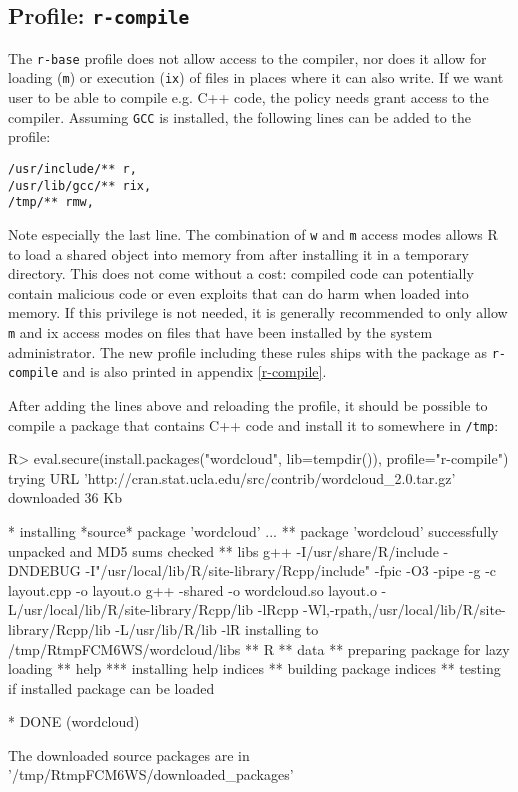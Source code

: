 \documentclass{jss}
\newcommand{\R}{\textsf{R}\xspace}
\newcommand{\Cpp}{\textsf{C++}\xspace}
\begin{document}
\subsection[Profile: r-compile]{Profile: \texttt{r-compile}}

The \texttt{r-base} profile does not allow access to the compiler, nor does it
allow for loading (\texttt{m}) or execution (\texttt{ix}) of files in places
where it can also write. If we want user to be able to compile e.g.
\Cpp code, the policy needs grant access to the compiler. Assuming \texttt{GCC} is installed,
the following lines can be added to the profile:

\begin{verbatim}
/usr/include/** r,
/usr/lib/gcc/** rix,
/tmp/** rmw,
\end{verbatim}

Note especially the last line. The combination of \texttt{w} and \texttt{m} access modes
allows \R to load a shared object into memory from after installing it in a temporary directory.
This does not come without a cost: compiled code can potentially contain
malicious code or even exploits that can do harm when loaded into memory. If
this privilege is not needed, it is generally recommended to only allow
\texttt{m} and {ix} access modes on files that have been installed by the
system administrator. The new profile including these rules ships with the
package as \texttt{r-compile} and is also printed in appendix \ref{r-compile}.

After adding the lines above and reloading the profile, it should be possible to
compile a package that contains \Cpp code and install it to somewhere
in \texttt{/tmp}:

\begin{CodeChunk}
\begin{CodeInput}
R> eval.secure(install.packages("wordcloud", lib=tempdir()), profile="r-compile")
trying URL 'http://cran.stat.ucla.edu/src/contrib/wordcloud_2.0.tar.gz'
downloaded 36 Kb

* installing *source* package 'wordcloud' ...
** package 'wordcloud' successfully unpacked and MD5 sums checked
** libs
g++ -I/usr/share/R/include -DNDEBUG -I"/usr/local/lib/R/site-library/Rcpp/include"
   -fpic  -O3 -pipe  -g  -c layout.cpp -o layout.o
g++ -shared -o wordcloud.so layout.o -L/usr/local/lib/R/site-library/Rcpp/lib
   -lRcpp -Wl,-rpath,/usr/local/lib/R/site-library/Rcpp/lib -L/usr/lib/R/lib -lR
installing to /tmp/RtmpFCM6WS/wordcloud/libs
** R
** data
** preparing package for lazy loading
** help
*** installing help indices
** building package indices
** testing if installed package can be loaded

* DONE (wordcloud)

The downloaded source packages are in
	'/tmp/RtmpFCM6WS/downloaded_packages'
\end{CodeInput}
\end{CodeChunk}
\end{document}
